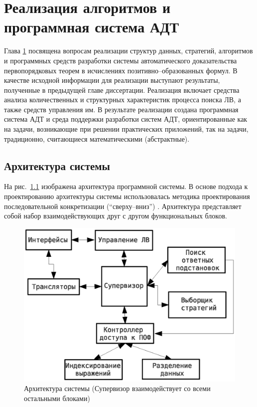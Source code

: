 \chapter{Реализация алгоритмов и программная система АДТ}\label{part:three}

Глава \ref{part:three} посвящена вопросам реализации структур данных, стратегий, алгоритмов и программных средств разработки системы автоматического доказательства первопорядковых теорем в исчислениях позитивно--образованных формул. В качестве исходной информации для реализации выступают результаты, полученные в предыдущей главе диссертации. Реализация включает средства анализа количественных и структурных характеристик процесса поиска ЛВ, а также средств управления им. В результате реализации создана программная система АДТ и среда поддержки разработки систем АДТ, ориентированные как на задачи, возникающие при решении практических приложений, так на задачи, традиционно, считающиеся математическими (абстрактные).



\section{Архитектура системы}
На рис.~\ref{fig:design1} изображена архитектура программной системы. В основе подхода к проектированию архитектуры системы использовалась методика проектирования последовательной конкретизации (``сверху--вниз'') \cite{yodan}. Архитектура представляет собой набор взаимодействующих друг с другом функциональных блоков.
\begin{figure}[h]
	\centering
	\includegraphics[width=0.7\linewidth]{pics/Design1.eps}
	\caption{Архитектура системы (Супервизор взаимодействует со всеми остальными блоками)}
	\label{fig:design1}
\end{figure}

